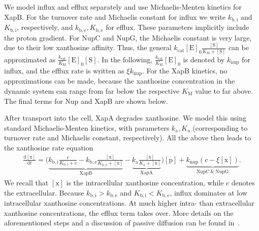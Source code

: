 \documentclass[10pt,letterpaper]{article}
\newcommand{\n}[1]{\mathrm{#1}}
\newcommand{\dd}[2]{\frac{\mathrm{d} #1}{\mathrm{d} #2}}
\begin{document}
We model influx and efflux separately and use Michaelis-Menten kinetics for
XapB. For the turnover rate and Michaelis constant for influx we write
$k_{\n{b, i}}$ and $K_{\n{b, i}}$, respectively, and $k_{\n{b, e}}, K_{\n{b,
e}}$ for efflux. These parameters implicitly include the proton gradient.
For NupC and NupG, the Michaelis constant is very large, due to their low
xanthosine affinity. Thus, the general $k_{\n{cat}} \n{[E]_0}
\frac{\n{[S]}}{K_{\n{M}} + \n{[S]}}$ can be approximated as
$\frac{k_{\n{cat}}}{K_{\n{M}}} \n{[E]_0} \n{[S]}$. In the following,
$\frac{k_{\n{cat}}}{K_{\n{M}}} \n{[E]_0}$ is denoted by $k_{\n{nup}}$ for
influx, and the efflux rate is written as $\xi k_{\n{nup}}$. For the XapB
kinetics, no approximations can be made, because the xanthosine
concentration in the dynamic system can range from far below the respective
$K_{\n{M}}$ value to far above. The final terms for Nup and XapB are shown
below.

After transport into the cell, XapA degrades xanthosine. We model this using
standard Michaelis-Menten kinetics, with parameters $k_{\n{a}}, K_{\n{a}}$
(corresponding to turnover rate and Michaelis constant, respectively). All
the above then leads to the xanthosine rate equation
\begin{eqnarray}
\dd{\n{[x]}}{t} = \biggl(\underbrace{k_{\n{b,i}} \frac{c}{K_{\n{b,i}} + c} - k_{\n{b,e}} \frac{\n{[x]}}{K_{\n{b,e}} + \n{[x]}}}_{\n{XapB}} - \underbrace{k_{\n{a}} \frac{\n{[x]}}{K_{\n{a}} + \n{[x]}}}_{\n{XapA}}\biggr) \n{[p]} + \underbrace{k_{\n{nup}} \left(c- \xi \n{[x]}\right)}_{\n{NupC\ \& \ NupG}}.
\end{eqnarray}
We recall that $\n{[x]}$ is the intracellular xanthosine concentration, while
$c$ denotes the extracellular. Because $k_{\n{b,i}} > k_{\n{b,e}}$ and
$K_{\n{b,i}} < K_{\n{b,e}}$, influx dominates at low intracellular
xanthosine concentrations. At much higher intra- than extracellular
xanthosine concentrations, the efflux term takes over. More details on the
aforementioned steps and a discussion of passive diffusion can be found
in~.
\end{document}
